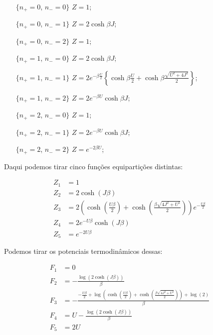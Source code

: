 \begin{itemize}

\item[$\{ n_{+} = 0$, $n_{-} = 0 \}$] $Z=1$;

\item[$\{ n_{+} = 0$, $n_{-} = 1 \}$] $Z=2\cosh{\beta J}$;

\item[$\{ n_{+} = 0$, $n_{-} = 2 \}$] $Z=1$;

\item[$\{ n_{+} = 1$, $n_{-} = 0 \}$] $Z=2\cosh{\beta J}$;

\item[$\{ n_{+} = 1$, $n_{-} = 1 \}$] $Z=2e^{- \beta \frac{U}{2}}\left\{ \cosh{\beta \frac{U}{2}} + \cosh{\beta \frac{\sqrt{U^2+4J^2}}{2}} \right\}$;

\item[$\{ n_{+} = 1$, $n_{-} = 2 \}$] $Z=2e^{-\beta U} \cosh{\beta J}$;

\item[$\{ n_{+} = 2$, $n_{-} = 0 \}$] $Z=1$;

\item[$\{ n_{+} = 2$, $n_{-} = 1 \}$] $Z=2e^{- \beta U} \cosh{\beta J}$;

\item[$\{ n_{+} = 2$, $n_{-} = 2 \}$] $Z=e^{-2\beta U}$;

\end{itemize}

Daqui podemos tirar cinco funções equipartições distintas:

\begin{subequations}
\begin{align}
Z_1 &= 1 \\
Z_2 &= 2 \cosh{\left (J \beta \right )} \\
Z_3 &= 2 \left(\cosh{\left (\frac{U \beta}{2} \right )} + \cosh{\left (\frac{\beta \sqrt{4 J^{2} + U^{2}}}{2} \right )}\right) e^{- \frac{U \beta}{2}} \\
Z_4 &= 2 e^{- U \beta} \cosh{\left (J \beta \right )} \\
Z_5 &= e^{- 2 U \beta}
\end{align}
\label{equipart}
\end{subequations}

Podemos tirar os potenciais termodinâmicos dessas:

\begin{subequations}
\begin{align}
F_1 &= 0 \\
F_2 &= - \frac{\log{\left (2 \cosh{\left (J \beta \right )} \right )}}{\beta} \\
F_3 &= - \frac{- \frac{U \beta}{2} + \log{\left (\cosh{\left (\frac{U \beta}{2} \right )} + \cosh{\left (\frac{\beta \sqrt{4 J^{2} + U^{2}}}{2} \right )} \right )} + \log{\left (2 \right )}}{\beta} \\
F_4 &= U - \frac{\log{\left (2 \cosh{\left (J \beta \right )} \right )}}{\beta} \\
F_5 &= 2U
\end{align}
\end{subequations}

